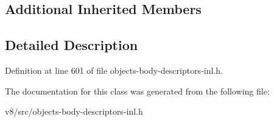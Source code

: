 \subsection*{Additional Inherited Members}


\subsection{Detailed Description}


Definition at line 601 of file objects-\/body-\/descriptors-\/inl.\+h.



The documentation for this class was generated from the following file\+:\begin{DoxyCompactItemize}
\item 
v8/src/objects-\/body-\/descriptors-\/inl.\+h\end{DoxyCompactItemize}

